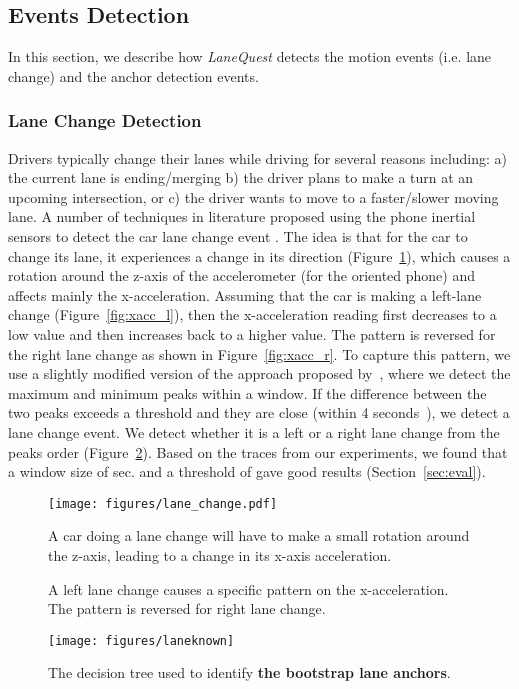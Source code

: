\documentclass[10pt, conference, compsocconf]{IEEEtran}
\def \sys {\textit{LaneQuest}}
\begin{document}
\subsection{Events Detection}\label{sec:event_detect}
In this section, we describe how \sys{} detects the motion events (i.e. lane change) and the anchor detection events.
\subsubsection{Lane Change Detection}\label{subsec:lane_change_det}
Drivers typically change their lanes while driving for several reasons including: a) the current lane is ending/merging b) the driver plans to make a turn at an upcoming intersection, or c) the driver wants to move to a faster/slower moving lane. A number of techniques in literature proposed using the phone inertial sensors to detect the car lane change event \cite{fazeen2012safe,li2012marvel}. The idea is that for the car to change its lane, it experiences a change in its direction (Figure~\ref{fig:lane_change_ex}), which causes a rotation around the z-axis of the accelerometer (for the oriented phone) and affects mainly the x-acceleration\cite{serway2013physics}. Assuming that the car is making a left-lane change (Figure~\ref{fig:xacc_l}), then the x-acceleration reading first decreases to a low value and then increases back to a higher value. The pattern is reversed for the right lane change as shown in Figure~\ref{fig:xacc_r}. To capture this pattern, we use a slightly modified version of the approach proposed by~\cite{li2012marvel}, where we detect the maximum and minimum peaks within a window. If the difference between the two peaks exceeds a threshold and they are close (within 4 seconds~\cite{li2012marvel}), we detect a lane change event. We detect whether it is a left or a right lane change from the peaks order (Figure~\ref{fig:lane_change}). Based on the traces from our experiments, we found that a window size of  sec. and a threshold of  gave good results (Section~\ref{sec:eval}).
\begin{figure}[!t]
\centering
\texttt{[image: figures/lane\_change.pdf]}
\caption{A car doing a lane change will have to make a small rotation around the z-axis, leading to a change in its x-axis acceleration.}
\label{fig:lane_change_ex}
\end{figure}
   \begin{figure}[!t]
    \centering
    \hspace{2pt}
\caption{A left lane change causes a specific pattern on the x-acceleration. The pattern is reversed for right lane change.}
\label{fig:lane_change}
\end{figure}
\begin{figure*}[!t]
\centering
\texttt{[image: figures/laneknown]}
\caption{The decision tree used to identify \textbf{the bootstrap lane anchors}.}
\label{fig:laneknown}
\end{figure*}
\end{document}
